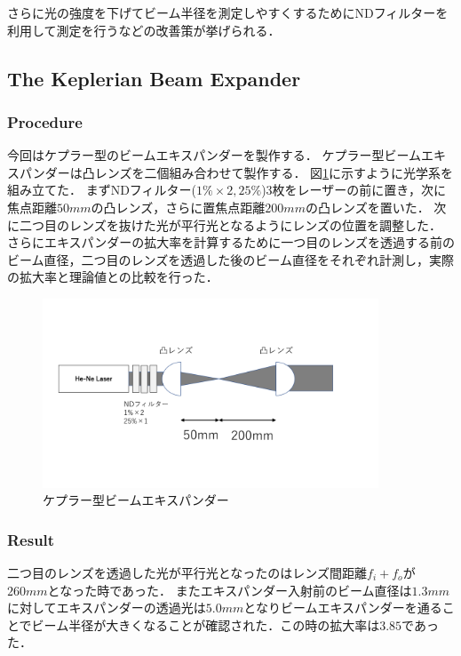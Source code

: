 \documentclass[11pt, a4paper]{jsarticle}
\begin{document}
さらに光の強度を下げてビーム半径を測定しやすくするためにNDフィルターを利用して測定を行うなどの改善策が挙げられる．
\subsection{The Keplerian Beam Expander}
\subsubsection{Procedure}
今回はケプラー型のビームエキスパンダーを製作する．
ケプラー型ビームエキスパンダーは凸レンズを二個組み合わせて製作する．
図\ref{fig:three}に示すように光学系を組み立てた．
まずNDフィルター($1\%\times2,25\%$)3枚をレーザーの前に置き，次に焦点距離$50mm$の凸レンズ，さらに置焦点距離$200mm$の凸レンズを置いた．
次に二つ目のレンズを抜けた光が平行光となるようにレンズの位置を調整した．
さらにエキスパンダーの拡大率を計算するために一つ目のレンズを透過する前のビーム直径，二つ目のレンズを透過した後のビーム直径をそれぞれ計測し，実際の拡大率と理論値との比較を行った．
\begin{figure}[htbp]
 \begin{center}
  \includegraphics[width=100mm]{fig3.png}
 \end{center}
 \caption{ケプラー型ビームエキスパンダー}
 \label{fig:three}
\end{figure}

\subsubsection{Result}
二つ目のレンズを透過した光が平行光となったのはレンズ間距離$f_i + f_o$が$260mm$となった時であった．
またエキスパンダー入射前のビーム直径は$1.3mm$に対してエキスパンダーの透過光は$5.0mm$となりビームエキスパンダーを通ることでビーム半径が大きくなることが確認された．この時の拡大率は$3.85$であった．
\end{document}
